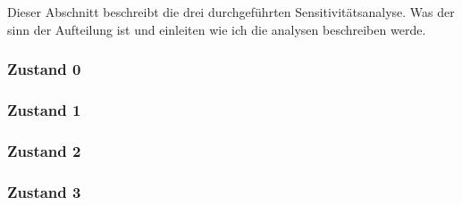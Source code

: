 %
%
%
%

\label{subsec:Sensitivitätsanalyse}

Dieser Abschnitt beschreibt die drei durchgeführten Sensitivitätsanalyse. Was der sinn der Aufteilung ist und einleiten wie ich die analysen beschreiben werde.

\subsubsection*{Zustand 0}

\subsubsection*{Zustand 1}

\subsubsection*{Zustand 2}

\subsubsection*{Zustand 3}



%

